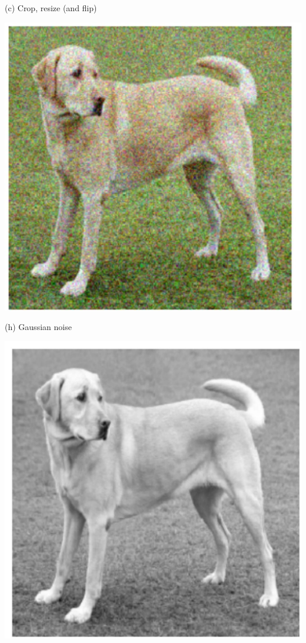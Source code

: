 \documentclass[10pt]{article}
\begin{document}
(c) Crop, resize (and flip)

\begin{center}
\includegraphics[max width=\textwidth]{2024_01_08_959e2db67a31f073f6d2g-24(8)}
\end{center}

(h) Gaussian noise

\begin{center}
\includegraphics[max width=\textwidth]{2024_01_08_959e2db67a31f073f6d2g-24(6)}
\end{center}
\end{document}
